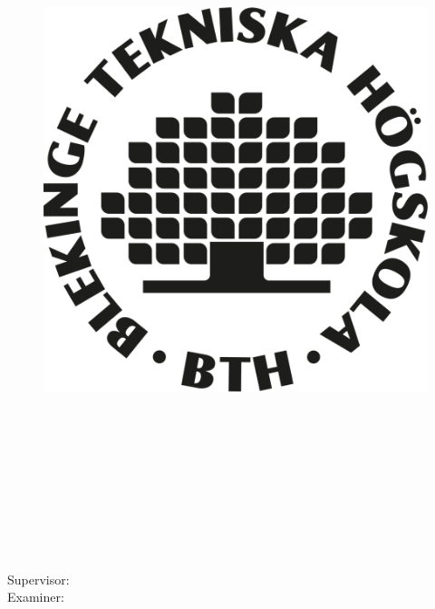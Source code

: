 \begin{center}
\begin{figure}[H]
    \includegraphics[width=0.2\pdfpagewidth]{figure/auxiliary/logo_circle.png} \\
    \fi

	\end{figure}	\vspace{5mm}	
	
	\dept \\
	\textsc{\university} \\
	\address \  \the\year \\
\end{center}


\newpage
\thispagestyle{plain}
\vspace*{4.5cm}
\maintitle \\
\\[0.1cm]
\authorm \\
\authorp \\
\authort
\setlength{\parskip}{1cm}


Supervisor: \supervisor \\
Examiner: \examiner \setlength{\parskip}{1cm}


